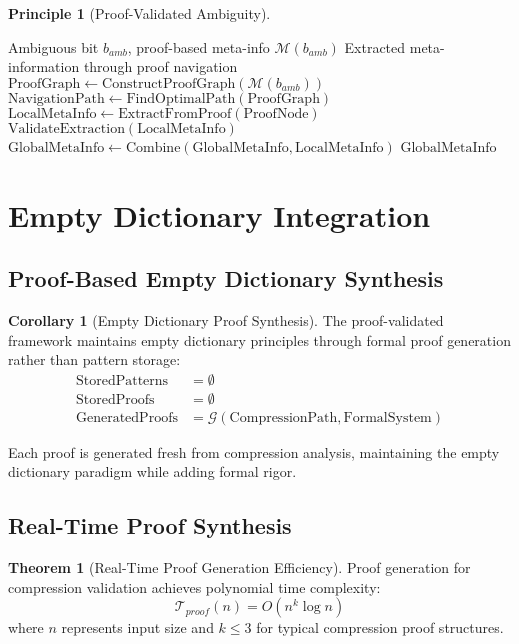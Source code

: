 \documentclass[12pt,a4paper]{article}
\theoremstyle{definition}
\newtheorem{theorem}{Theorem}
\newtheorem{principle}{Principle}
\newtheorem{corollary}{Corollary}
\begin{document}
\begin{principle}[Proof-Validated Ambiguity]
\begin{algorithm}[H]
\caption{Proof-Space Meta-Information Navigation}
\begin{algorithmic}[1]
\REQUIRE Ambiguous bit $b_{amb}$, proof-based meta-info $\mathcal{M}(b_{amb})$
\ENSURE Extracted meta-information through proof navigation
\STATE $\text{ProofGraph} \leftarrow \text{ConstructProofGraph}(\mathcal{M}(b_{amb}))$
\STATE $\text{NavigationPath} \leftarrow \text{FindOptimalPath}(\text{ProofGraph})$
    \STATE $\text{LocalMetaInfo} \leftarrow \text{ExtractFromProof}(\text{ProofNode})$
    \STATE $\text{ValidateExtraction}(\text{LocalMetaInfo})$
    \STATE $\text{GlobalMetaInfo} \leftarrow \text{Combine}(\text{GlobalMetaInfo}, \text{LocalMetaInfo})$
\ENDFOR
\RETURN $\text{GlobalMetaInfo}$
\end{algorithmic}
\end{algorithm}

\section{Empty Dictionary Integration}

\subsection{Proof-Based Empty Dictionary Synthesis}

\begin{corollary}[Empty Dictionary Proof Synthesis]
The proof-validated framework maintains empty dictionary principles through formal proof generation rather than pattern storage:
\begin{align}
\text{StoredPatterns} &= \emptyset \\
\text{StoredProofs} &= \emptyset \\
\text{GeneratedProofs} &= \mathcal{G}(\text{CompressionPath}, \text{FormalSystem})
\end{align}
\end{corollary}

Each proof is generated fresh from compression analysis, maintaining the empty dictionary paradigm while adding formal rigor.

\subsection{Real-Time Proof Synthesis}

\begin{theorem}[Real-Time Proof Generation Efficiency]
Proof generation for compression validation achieves polynomial time complexity:
\begin{equation}
\mathcal{T}_{proof}(n) = O(n^k \log n)
\end{equation}
where $n$ represents input size and $k \leq 3$ for typical compression proof structures.
\end{theorem}


\end{principle}
\end{document}
